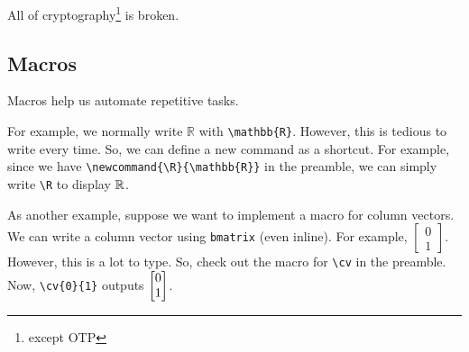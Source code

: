 \documentclass{article}
\begin{document}
\begin{corollary}
    All of cryptography\footnote{except OTP} is broken.
\end{corollary}

\subsection{Macros}

Macros help us automate repetitive tasks.

For example, we normally write $\mathbb{R}$ with \texttt{\textbackslash mathbb\{R\}}. However, this is tedious to write every time. So, we can define a new command as a shortcut. For example, since we have \texttt{\textbackslash newcommand\{\textbackslash R\}\{\textbackslash mathbb\{R\}\}} in the preamble, we can simply write \texttt{\textbackslash R} to display $\mathbb{R}$.

As another example, suppose we want to implement a macro for column vectors. We can write a column vector using \texttt{bmatrix} (even inline). For example, $\begin{bmatrix}0\\1\end{bmatrix}$. However, this is a lot to type. So, check out the macro for \texttt{\textbackslash cv} in the preamble. Now, \texttt{\textbackslash cv\{0\}\{1\}} outputs $\begin{bmatrix}0\\1\end{bmatrix}$.

\newpage
\printbibliography
\end{document}

